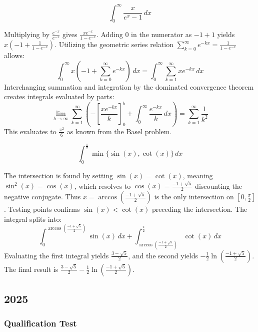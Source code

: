 \begin{questions}
    \question \[ \int_{0}^{\infty}\frac{x}{e^{x}-1} \,dx \]
    \begin{solution}
        Multiplying by $\frac{e^{-x}}{e^{-x}}$ gives $\frac{xe^{-x}}{1-e^{-x}}$.
        Adding $0$ in the numerator as $-1+1$ yields $x\left(-1+\frac{1}{1-e^{-x}}\right)$. Utilizing the geometric series relation $\sum_{k=0}^{\infty}e^{-kx}=\frac{1}{1-e^{-x}}$ allows:
        \[ \int_{0}^{\infty}x\left(-1+\sum_{k=0}^{\infty}e^{-kx}\right) \,dx = \int_{0}^{\infty}\sum_{k=1}^{\infty}xe^{-kx} \,dx \]
        Interchanging summation and integration by the dominated convergence theorem creates integrals evaluated by parts:
        \[ \lim_{b \to \infty}\sum_{k=1}^{\infty}\left( -\left[ \frac{xe^{-kx}}{k} \right]_{0}^{b} + \int_{0}^{\infty}\frac{e^{-kx}}{k} \,dx \right) = \sum_{k=1}^{\infty}\frac{1}{k^{2}} \]
        This evaluates to $\frac{\pi^{2}}{6}$ as known from the Basel problem.
    \end{solution}

    \question \[ \int_{0}^{\frac{\pi}{2}}\min\{\sin(x),\cot(x)\} \,dx \]
    \begin{solution}
        The intersection is found by setting $\sin(x)=\cot(x)$, meaning $\sin^{2}(x)=\cos(x)$, which resolves to $\cos(x)=\frac{-1+\sqrt{5}}{2}$ discounting the negative conjugate. Thus $x=\arccos\left(\frac{-1+\sqrt{5}}{2}\right)$ is the only intersection on $[0, \frac{\pi}{2}]$.
        Testing points confirms $\sin(x) < \cot(x)$ preceding the intersection. The integral splits into:
        \[ \int_{0}^{\arccos\left(\frac{-1+\sqrt{5}}{2}\right)}\sin(x) \,dx + \int_{\arccos\left(\frac{-1+\sqrt{5}}{2}\right)}^{\frac{\pi}{2}}\cot(x) \,dx \]
        Evaluating the first integral yields $\frac{3-\sqrt{5}}{2}$, and the second yields $-\frac{1}{2}\ln\left(\frac{-1+\sqrt{5}}{2}\right)$.
        The final result is $\frac{3-\sqrt{5}}{2}-\frac{1}{2}\ln\left(\frac{-1+\sqrt{5}}{2}\right)$.
    \end{solution}
\end{questions}

\subsection*{2025}
\subsubsection*{Qualification Test}

